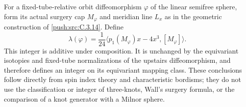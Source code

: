 \begin{proposition}\label{push:src:C.3.26}
For a fixed-tube-relative orbit diffeomorphism $\varphi$ of the
linear semifree sphere, form its actual surgery cap $M_\varphi$
and meridian line $L_x$ as in the geometric construction of
\ref{push:src:C.3.14}. Define
\[
 \lambda(\varphi)=\frac{1}{24}
      \langle p_1(M_\varphi)x-4x^3,[M_\varphi]\rangle.
\]
This integer is additive under composition. It is unchanged by
the equivariant isotopies and fixed-tube normalizations of the
upstairs diffeomorphism, and therefore defines an integer on its
equivariant mapping class. These conclusions follow directly
from spin index theory and characteristic bordisms; they do not
use the classification or integer of three-knots, Wall's surgery
formula, or the comparison of a knot generator with a Milnor sphere.
\end{proposition}
